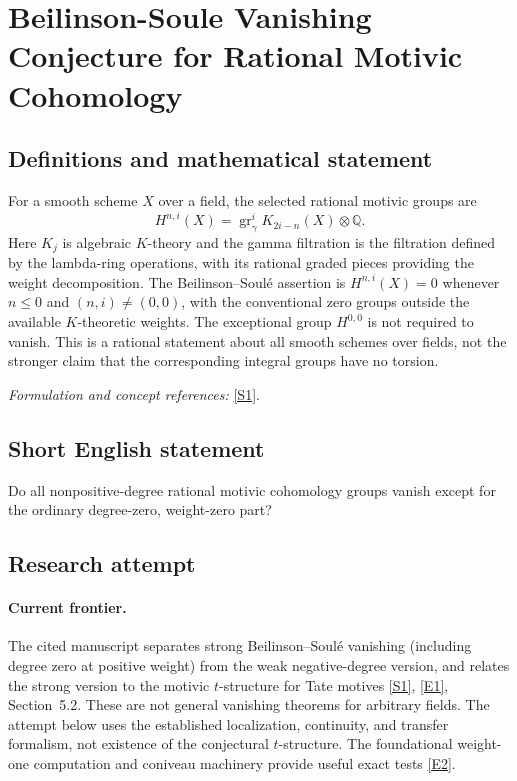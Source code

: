 \documentclass[11pt,a4paper]{article}
\newcommand{\Q}{\mathbb{Q}}
\newcommand{\sref}[2]{\hyperlink{source:#1:#2}{[S#2]}}
\newcommand{\eref}[2]{\hyperlink{extra:#1:#2}{[E#2]}}
\newif\ifshowcatalogue
\newcommand{\cataloguescope}[1]{\ifshowcatalogue
 \paragraph{Exact scope in the supplied catalogue.}
 \begin{quote}\small #1\end{quote}\fi}
\numberwithin{equation}{section}
\begin{document}
\setcounter{section}{0}
\clearpage
\section*{\texorpdfstring{Beilinson-Soule Vanishing Conjecture for Rational Motivic Cohomology}{Beilinson-Soule Vanishing Conjecture for Rational Motivic Cohomology}}\label{30006779}
\subsection{Definitions and mathematical statement}
For a smooth scheme $X$ over a field, the selected rational motivic groups are
\[
 H^{n,i}(X)=\operatorname{gr}_{\gamma}^{i}K_{2i-n}(X)\otimes\Q.
\]
Here $K_j$ is algebraic $K$-theory and the gamma filtration is the filtration defined by the lambda-ring operations, with its rational graded pieces providing the weight decomposition. The Beilinson--Soul\'e assertion is
$H^{n,i}(X)=0$ whenever $n\le0$ and $(n,i)\ne(0,0)$, with the conventional zero groups outside the available $K$-theoretic weights. The exceptional group $H^{0,0}$ is not required to vanish. This is a rational statement about all smooth schemes over fields, not the stronger claim that the corresponding integral groups have no torsion.
\par\smallskip\textit{Formulation and concept references:} \sref{30006779}{1}.
\cataloguescope{Prove that for every smooth scheme X over a field k the rational motivic cohomology groups H\textasciicircum{}(n,i)(X), defined as the i-th graded piece for the gamma filtration on K\_(2i-n)(X) tensored with the rationals, vanish whenever n <= 0 and the pair (n,i) is not (0,0).}
\subsection{Short English statement}
Do all nonpositive-degree rational motivic cohomology groups vanish except for the ordinary degree-zero, weight-zero part?
\subsection{Research attempt}

\paragraph{Current frontier.}
The cited manuscript separates strong Beilinson--Soul\'e vanishing (including degree zero at positive weight) from the weak negative-degree version, and relates the strong version to the motivic $t$-structure for Tate motives \sref{30006779}{1}, \eref{30006779}{1}, Section~5.2. These are not general vanishing theorems for arbitrary fields. The attempt below uses the established localization, continuity, and transfer formalism, not existence of the conjectural $t$-structure. The foundational weight-one computation and coniveau machinery provide useful exact tests \eref{30006779}{2}.
\end{document}
